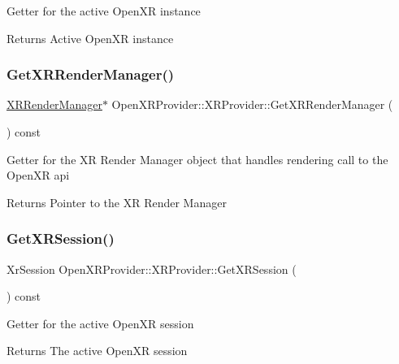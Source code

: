 Getter for the active Open\+XR instance \begin{DoxyReturn}{Returns}
Active Open\+XR instance 
\end{DoxyReturn}
\mbox{\label{class_open_x_r_provider_1_1_x_r_provider_a23af3c59dab3caab02728403adae13f4}} 
\subsubsection{\texorpdfstring{GetXRRenderManager()}{GetXRRenderManager()}}
{\footnotesize\ttfamily \mbox{\hyperlink{class_open_x_r_provider_1_1_x_r_render_manager}{X\+R\+Render\+Manager}}$\ast$ Open\+X\+R\+Provider\+::\+X\+R\+Provider\+::\+Get\+X\+R\+Render\+Manager (\begin{DoxyParamCaption}{ }\end{DoxyParamCaption}) const\hspace{0.3cm}{\ttfamily [inline]}}

Getter for the XR Render Manager object that handles rendering call to the Open\+XR api \begin{DoxyReturn}{Returns}
Pointer to the XR Render Manager 
\end{DoxyReturn}
\mbox{\label{class_open_x_r_provider_1_1_x_r_provider_adfd13c0c76ff0fec35674d343ba55c06}} 
\subsubsection{\texorpdfstring{GetXRSession()}{GetXRSession()}}
{\footnotesize\ttfamily Xr\+Session Open\+X\+R\+Provider\+::\+X\+R\+Provider\+::\+Get\+X\+R\+Session (\begin{DoxyParamCaption}{ }\end{DoxyParamCaption}) const\hspace{0.3cm}{\ttfamily [inline]}}

Getter for the active Open\+XR session \begin{DoxyReturn}{Returns}
The active Open\+XR session 
\end{DoxyReturn}
\mbox{\label{class_open_x_r_provider_1_1_x_r_provider_a53db40884126aaa44f32953fa889fb76}} 
